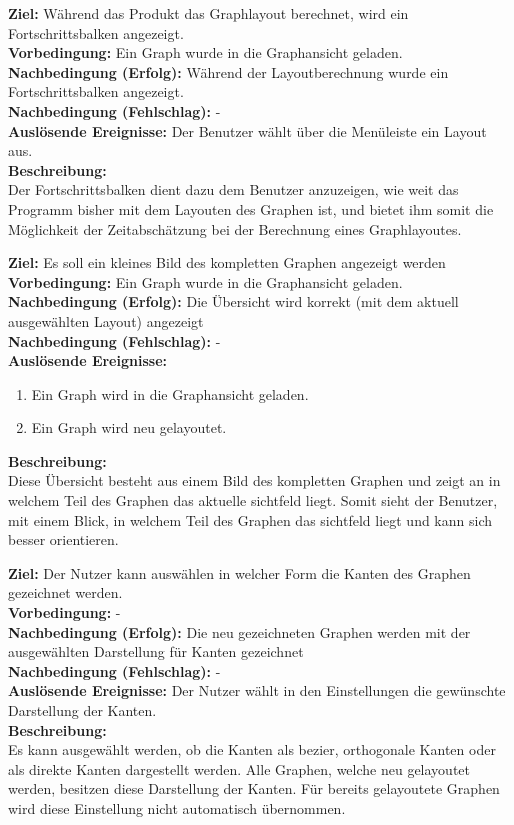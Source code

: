 \label{fa:fortschritt}
\textbf{Ziel:} Während das Produkt das Graphlayout berechnet, wird ein Fortschrittsbalken angezeigt.\\
\textbf{Vorbedingung:} Ein Graph wurde in die Graphansicht geladen.\\
\textbf{Nachbedingung (Erfolg):} Während der Layoutberechnung wurde ein Fortschrittsbalken angezeigt.\\
\textbf{Nachbedingung (Fehlschlag):} -\\
\textbf{Auslösende Ereignisse:} Der Benutzer wählt über die Menüleiste ein Layout aus.\\
\textbf{Beschreibung:}\\
Der Fortschrittsbalken dient dazu dem Benutzer anzuzeigen, wie weit das Programm bisher mit dem Layouten des Graphen ist, und bietet ihm somit die Möglichkeit der Zeitabschätzung bei der Berechnung eines Graphlayoutes.

\label{fa:uebersicht}
\textbf{Ziel:} Es soll ein kleines Bild des kompletten Graphen angezeigt werden \\
\textbf{Vorbedingung:} Ein Graph wurde in die Graphansicht geladen.\\
\textbf{Nachbedingung (Erfolg):} Die Übersicht wird korrekt (mit dem aktuell ausgewählten Layout) angezeigt \\
\textbf{Nachbedingung (Fehlschlag):} -\\
\textbf{Auslösende Ereignisse:}
\begin{enumerate}[nolistsep, label=(\alph*)]
  \item Ein Graph wird in die Graphansicht geladen.
  \item Ein Graph wird neu gelayoutet.
\end{enumerate}
\textbf{Beschreibung:}\\
Diese Übersicht besteht aus einem Bild des kompletten Graphen und zeigt an in welchem Teil des Graphen das aktuelle \gls{sichtfeld} liegt. Somit sieht der Benutzer, mit einem Blick, in welchem Teil des Graphen das \gls{sichtfeld} liegt und kann sich besser orientieren.

\label{fa:darst-kanten}
\textbf{Ziel:} Der Nutzer kann auswählen in welcher Form die Kanten des Graphen gezeichnet werden. \\
\textbf{Vorbedingung:} -\\
\textbf{Nachbedingung (Erfolg):} Die neu gezeichneten Graphen werden mit der ausgewählten Darstellung für Kanten gezeichnet \\
\textbf{Nachbedingung (Fehlschlag):} -\\
\textbf{Auslösende Ereignisse:} Der Nutzer wählt in den Einstellungen die gewünschte Darstellung der Kanten.\\
\textbf{Beschreibung:}\\
Es kann ausgewählt werden, ob die Kanten als \gls{bezier}, orthogonale Kanten oder als direkte Kanten dargestellt werden. Alle Graphen, welche neu gelayoutet werden, besitzen diese Darstellung der Kanten. Für bereits gelayoutete Graphen wird diese Einstellung nicht automatisch übernommen.

